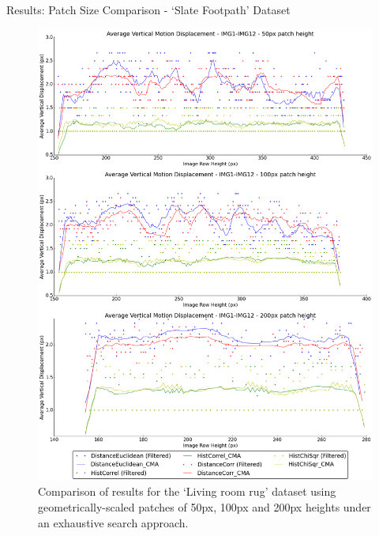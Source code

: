 \documentclass[10pt, compress]{beamer}
\begin{document}
\begin{frame}{Results: Patch Size Comparison - `Slate Footpath' Dataset}

\begin{figure}[ht!]
\centering
\vspace{-0.5cm}
\includegraphics[scale=0.13]{path_outside_10cm_scaled.png}
\caption{Comparison of results for the `Living room rug' dataset using geometrically-scaled patches of 50px, 100px and 200px heights under an exhaustive search approach.}
\end{figure}

\end{frame}

\end{document}
